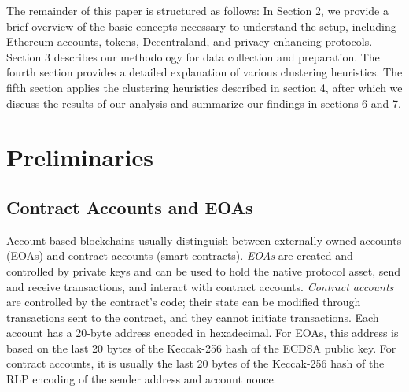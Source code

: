 \documentclass[12pt,a4paper,titlepage,oneside,english]{article}
\begin{document}
The remainder of this paper is structured as follows: In Section 2, we provide a brief overview of the basic concepts necessary to understand the setup, including Ethereum accounts, tokens, Decentraland, and privacy-enhancing protocols. Section 3 describes our methodology for data collection and preparation. The fourth section provides a detailed explanation of various clustering heuristics. The fifth section applies the clustering heuristics described in section 4, after which we discuss the results of our analysis and summarize our findings in sections 6 and 7.



\section{Preliminaries}

\subsection{Contract Accounts and EOAs}
Account-based blockchains usually distinguish between externally owned accounts (EOAs) and contract accounts (smart contracts). \textit{EOAs} are created and controlled by private keys and can be used to hold the native protocol asset, send and receive transactions, and interact with contract accounts. \textit{Contract accounts} are controlled by the contract's code; their state can be modified through transactions sent to the contract, and they cannot initiate transactions. \citep{buterin2014ethereum} \newline Each account has a 20-byte address encoded in hexadecimal. For EOAs, this address is based on the last 20 bytes of the Keccak-256 hash of the ECDSA public key. For contract accounts, it is usually the last 20 bytes of the Keccak-256 hash of the RLP encoding of the sender address and account nonce. \citep{GW:14}
\end{document}
